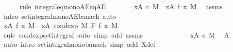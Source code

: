 \begin{isabellebody}
\ \ \ \ \isamarkupfalse%
\ {\isacharparenleft}{\kern0pt}rule\ integral{\isacharunderscore}{\kern0pt}eq{\isacharunderscore}{\kern0pt}mono{\isacharunderscore}{\kern0pt}AE{\isacharunderscore}{\kern0pt}eq{\isacharunderscore}{\kern0pt}AE{\isacharparenright}{\kern0pt}\isanewline
\ \ \ \ \ \ \isamarkupfalse%
\ {\isachardoublequoteopen}{\isacharparenleft}{\kern0pt}{\isasymintegral}x{\isasymin}A{\isachardot}{\kern0pt}\ c\ {\isasympartial}M{\isacharparenright}{\kern0pt}\ {\isasymle}\ {\isacharparenleft}{\kern0pt}{\isasymintegral}x{\isasymin}A{\isachardot}{\kern0pt}\ f\ x\ {\isasympartial}M{\isacharparenright}{\kern0pt}{\isachardoublequoteclose}\ \isamarkupfalse%
\ assms{\isacharparenleft}{\kern0pt}{}{\isacharparenright}{\kern0pt}\ \isamarkupfalse%
\ {\isacharparenleft}{\kern0pt}intro\ set{\isacharunderscore}{\kern0pt}integral{\isacharunderscore}{\kern0pt}mono{\isacharunderscore}{\kern0pt}AE{\isacharunderscore}{\kern0pt}banach{\isacharparenright}{\kern0pt}\ auto\isanewline
\ \ \ \ \ \ \isamarkupfalse%
\isanewline
\ \ \ \ \ \ \isacommand{{\isacharbraceleft}{\kern0pt}}\isamarkupfalse%
\isanewline
\ \ \ \ \ \ \ \ \isamarkupfalse%
\ {\isachardoublequoteopen}{\isacharparenleft}{\kern0pt}{\isasymintegral}x{\isasymin}A{\isachardot}{\kern0pt}\ f\ x\ {\isasympartial}M{\isacharparenright}{\kern0pt}\ {\isacharequal}{\kern0pt}\ {\isacharparenleft}{\kern0pt}{\isasymintegral}x{\isasymin}A{\isachardot}{\kern0pt}\ cond{\isacharunderscore}{\kern0pt}exp\ M\ F\ f\ x\ {\isasympartial}M{\isacharparenright}{\kern0pt}{\isachardoublequoteclose}\ \isamarkupfalse%
\ {\isacharparenleft}{\kern0pt}rule\ cond{\isacharunderscore}{\kern0pt}exp{\isacharunderscore}{\kern0pt}set{\isacharunderscore}{\kern0pt}integral{\isacharcomma}{\kern0pt}\ auto\ simp\ add{\isacharcolon}{\kern0pt}\ assms{\isacharparenright}{\kern0pt}\isanewline
\ \ \ \ \ \ \ \ \isamarkupfalse%
\ \isamarkupfalse%
\ {\isachardoublequoteopen}{\isachardot}{\kern0pt}{\isachardot}{\kern0pt}{\isachardot}{\kern0pt}\ {\isasymle}\ {\isacharparenleft}{\kern0pt}{\isasymintegral}x{\isasymin}A{\isachardot}{\kern0pt}\ c\ {\isasympartial}M{\isacharparenright}{\kern0pt}{\isachardoublequoteclose}\ \isamarkupfalse%
\ A\ \isamarkupfalse%
\ {\isacharparenleft}{\kern0pt}auto\ intro{\isacharbang}{\kern0pt}{\isacharcolon}{\kern0pt}\ set{\isacharunderscore}{\kern0pt}integral{\isacharunderscore}{\kern0pt}mono{\isacharunderscore}{\kern0pt}banach\ simp\ add{\isacharcolon}{\kern0pt}\ X{\isacharunderscore}{\kern0pt}def{\isacharparenright}{\kern0pt}\isanewline

\end{isabellebody}
